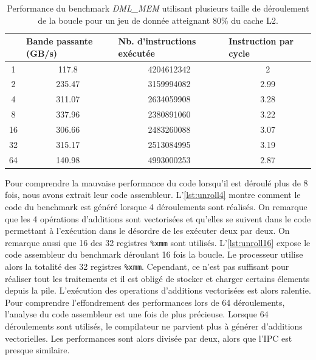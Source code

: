     \begin{table}[h!]
    \centering
    \begin{tabular}{|c|c|c|c|}
    \hline
    \rowcolor[HTML]{EFEFEF} 
    \multicolumn{1}{|l|}{\cellcolor[HTML]{EFEFEF}Nb. de déroulements} & \multicolumn{1}{l|}{\cellcolor[HTML]{EFEFEF}Bande passante (GB/s)} & \multicolumn{1}{l|}{\cellcolor[HTML]{EFEFEF}Nb. d'instructions exécutée} & \multicolumn{1}{l|}{\cellcolor[HTML]{EFEFEF}Instruction par cycle} \\ \hline
    1 & 117.8 & 4204612342 & 2 \\ \hline
    2 & 235.47 & 3159994082 & 2.99 \\ \hline
    4 & 311.07 & 2634059908 & 3.28 \\ \hline
    8 & 337.96 & 2380891060 & 3.22 \\ \hline
    16 & 306.66 & 2483260088 & 3.07 \\ \hline
    32 & 315.17 & 2513084995 & 3.19 \\ \hline
    64 & 140.98 & 4993000253 & 2.87 \\ \hline
    \end{tabular}%
    \caption{Performance du benchmark \textit{DML\_MEM} utilisant plusieurs taille de déroulement de la boucle pour un jeu de donnée atteignant 80\% du cache L2.}
    \label{tab:dml_unroll_bench}
    \end{table}
    
    Pour comprendre la mauvaise performance du code lorsqu'il est déroulé plus de 8 fois, nous avons extrait leur code assembleur. L'\autoref{lst:unroll4} montre comment le code du benchmark est généré lorsque 4 déroulements sont réalisés. On remarque que les 4 opérations d'additions sont vectorisées et qu'elles se suivent dans le code permettant à l'exécution dans le désordre de les exécuter deux par deux. On remarque aussi que 16 des 32 registres \verb|%xmm| sont utilisés. L'\autoref{lst:unroll16} expose le code assembleur du benchmark déroulant 16 fois la boucle. Le processeur utilise alors la totalité des 32 registres \verb|%xmm|. Cependant, ce n'est pas suffisant pour réaliser tout les traitements et il est obligé de stocker et charger certains élements depuis la pile. L'exécution des operations d'additions vectorisées est alors ralentie. Pour comprendre l'effondrement des performances lors de 64 déroulements, l'analyse du code assembleur est une fois de plus précieuse. Lorsque 64 déroulements sont utilisés, le compilateur ne parvient plus à générer d'additions vectorielles. Les performances sont alors divisée par deux, alors que l'IPC est presque similaire. 
    

